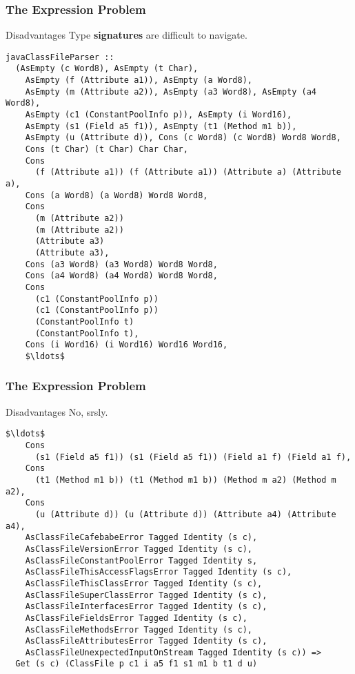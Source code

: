 \begin{frame}[fragile]
\frametitle{The Expression Problem}
\begin{block}{Disadvantages}
Type \textbf{signatures} are difficult to navigate.
\begin{lstlisting}[style=haskell,basicstyle=\tiny,mathescape]
javaClassFileParser ::
  (AsEmpty (c Word8), AsEmpty (t Char),
    AsEmpty (f (Attribute a1)), AsEmpty (a Word8),
    AsEmpty (m (Attribute a2)), AsEmpty (a3 Word8), AsEmpty (a4 Word8),
    AsEmpty (c1 (ConstantPoolInfo p)), AsEmpty (i Word16),
    AsEmpty (s1 (Field a5 f1)), AsEmpty (t1 (Method m1 b)),
    AsEmpty (u (Attribute d)), Cons (c Word8) (c Word8) Word8 Word8,
    Cons (t Char) (t Char) Char Char,
    Cons
      (f (Attribute a1)) (f (Attribute a1)) (Attribute a) (Attribute a),
    Cons (a Word8) (a Word8) Word8 Word8,
    Cons
      (m (Attribute a2))
      (m (Attribute a2))
      (Attribute a3)
      (Attribute a3),
    Cons (a3 Word8) (a3 Word8) Word8 Word8,
    Cons (a4 Word8) (a4 Word8) Word8 Word8,
    Cons
      (c1 (ConstantPoolInfo p))
      (c1 (ConstantPoolInfo p))
      (ConstantPoolInfo t)
      (ConstantPoolInfo t),
    Cons (i Word16) (i Word16) Word16 Word16,
    $\ldots$
\end{lstlisting}
\end{block}
\end{frame}

\begin{frame}[fragile]
\frametitle{The Expression Problem}
\begin{block}{Disadvantages}
No, srsly.
\begin{lstlisting}[style=haskell,basicstyle=\tiny,mathescape]
    $\ldots$
    Cons
      (s1 (Field a5 f1)) (s1 (Field a5 f1)) (Field a1 f) (Field a1 f),
    Cons
      (t1 (Method m1 b)) (t1 (Method m1 b)) (Method m a2) (Method m a2),
    Cons
      (u (Attribute d)) (u (Attribute d)) (Attribute a4) (Attribute a4),
    AsClassFileCafebabeError Tagged Identity (s c),
    AsClassFileVersionError Tagged Identity (s c),
    AsClassFileConstantPoolError Tagged Identity s,
    AsClassFileThisAccessFlagsError Tagged Identity (s c),
    AsClassFileThisClassError Tagged Identity (s c),
    AsClassFileSuperClassError Tagged Identity (s c),
    AsClassFileInterfacesError Tagged Identity (s c),
    AsClassFileFieldsError Tagged Identity (s c),
    AsClassFileMethodsError Tagged Identity (s c),
    AsClassFileAttributesError Tagged Identity (s c),
    AsClassFileUnexpectedInputOnStream Tagged Identity (s c)) =>
  Get (s c) (ClassFile p c1 i a5 f1 s1 m1 b t1 d u)
\end{lstlisting}
\end{block}
\end{frame}

